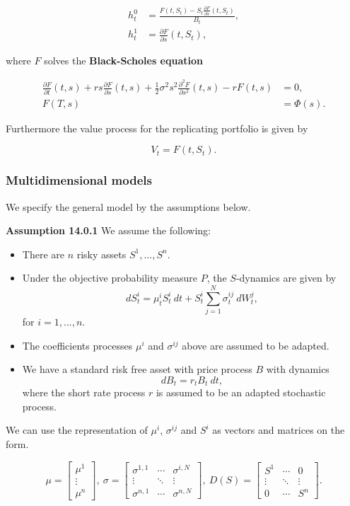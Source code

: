 \documentclass[
]{article}
\providecommand{\tightlist}{%
  \setlength{\itemsep}{0pt}\setlength{\parskip}{0pt}}
\begin{document}
\begin{align*}
h_t^0&=\frac{F(t,S_t)-S_t\frac{\partial F}{\partial s}(t,S_t)}{B_t},\\
h_t^1&=\frac{\partial F}{\partial s}(t,S_t),
\end{align*}

where \(F\) solves the \textbf{Black-Scholes equation}

\begin{align*}
\frac{\partial F}{\partial t}(t,s)+rs\frac{\partial F}{\partial s}(t,s)+\frac{1}{2}\sigma^2s^2 \frac{\partial^2 F}{\partial s^2}(t,s)-rF(t,s)&=0,\\
F(T,s)&=\Phi(s).
\end{align*}

Furthermore the value process for the replicating portfolio is given by

\[
V_t=F(t,S_t).
\]

\hypertarget{multidimensional-models}{%
\subsubsection{Multidimensional models}\label{multidimensional-models}}

We specify the general model by the assumptions below.

\textbf{Assumption 14.0.1} We assume the following:

\begin{itemize}
\tightlist
\item
  There are \(n\) risky assets \(S^1,...,S^n\).
\item
  Under the objective probability measure \(P\), the \(S\)-dynamics are
  given by \[
    dS_t^i=\mu_t^iS_t^i\ dt +S_t^i\sum_{j=1}^N\sigma_t^{ij}\ dW_t^j,
    \] for \(i=1,...,n\).
\item
  The coefficients processes \(\mu^i\) and \(\sigma^{ij}\) above are
  assumed to be adapted.
\item
  We have a standard risk free asset with price process \(B\) with
  dynamics \[
    dB_t=r_tB_t\ dt,
    \] where the short rate process \(r\) is assumed to be an adapted
  stochastic process.
\end{itemize}

We can use the representation of \(\mu^i\), \(\sigma^{ij}\) and \(S^i\)
as vectors and matrices on the form.

\[
\mu =
\begin{bmatrix}
\mu ^1\\
\vdots\\
\mu ^n
\end{bmatrix},\ \sigma=
\begin{bmatrix}
\sigma^{1,1}& \cdots & \sigma^{i,N}\\
\vdots & \ddots & \vdots\\
\sigma^{n,1}&\cdots&\sigma^{n,N}
\end{bmatrix},\ D(S)=
\begin{bmatrix}
S^{1}& \cdots & 0\\
\vdots & \ddots & \vdots\\
0&\cdots&S^n
\end{bmatrix}.
\]
\end{document}
